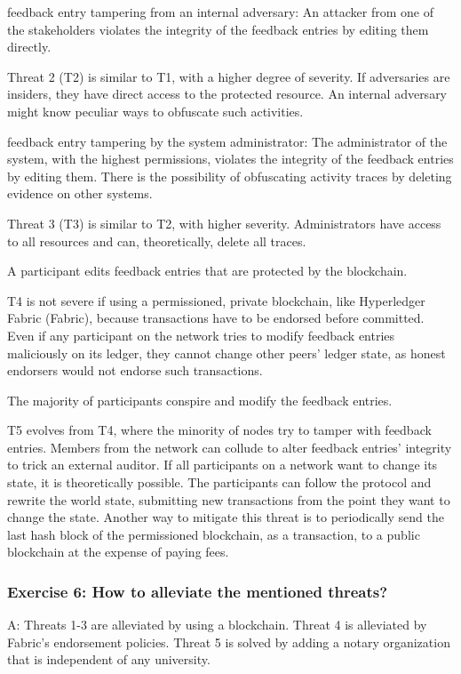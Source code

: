 \documentclass[12pt,a4paper]{article}
\begin{document}
\begin{threat}{feedback entry tampering from an internal adversary:} An attacker from one of the stakeholders violates the integrity of the feedback entries by editing them directly.
\end{threat}

Threat 2 (T2) is similar to T1, with a higher degree of severity. If adversaries are insiders, they have direct access to the protected resource. An internal adversary might know peculiar ways to obfuscate such activities.

\begin{threat}{feedback entry tampering by the system administrator:} The administrator of the system, with the highest permissions, violates the integrity of the feedback entries by editing them. There is the possibility of obfuscating activity traces by deleting evidence on other systems.
\end{threat}

Threat 3 (T3) is similar to T2, with higher severity. Administrators have access to all resources and can, theoretically, delete all traces.

\begin{threat}{A participant edits feedback entries that are protected by the blockchain.}
\end{threat}

T4 is not severe if using a permissioned, private blockchain, like Hyperledger Fabric (Fabric), because transactions have to be endorsed before committed. Even if any participant on the network tries to modify feedback entries maliciously on its ledger, they cannot change other peers' ledger state, as honest endorsers would not endorse such transactions.

\begin{threat}The majority of participants conspire and modify the feedback entries.
\end{threat}

T5 evolves from T4, where the minority of nodes try to tamper with feedback entries. Members from the network can collude to alter feedback entries' integrity to trick an external auditor. If all participants on a network want to change its state, it is theoretically possible. The participants can follow the protocol and rewrite the world state, submitting new transactions from the point they want to change the state. Another way to mitigate this threat is to periodically send the last hash block of the permissioned blockchain, as a transaction, to a public blockchain at the expense of paying fees.

\subsubsection*{Exercise 6: How to alleviate the mentioned threats?}
A: Threats 1-3 are alleviated by using a blockchain. Threat 4 is alleviated by Fabric's endorsement policies. Threat 5 is solved by adding a notary organization that is independent of any university.



\end{document}
